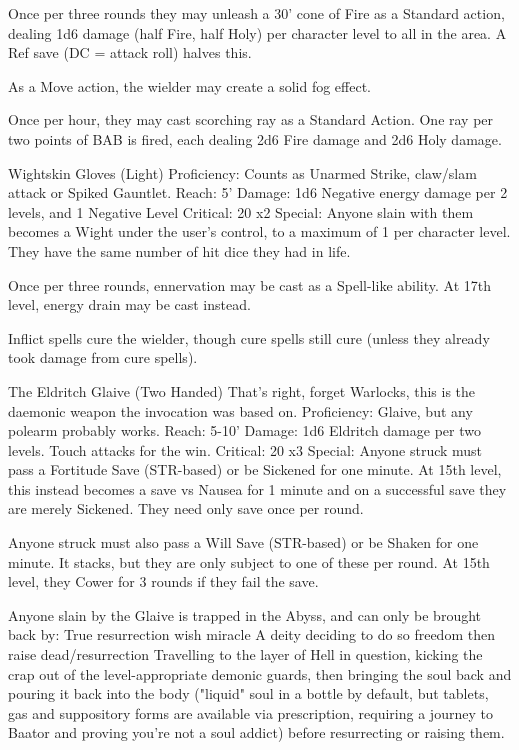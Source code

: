 Once per three rounds they may unleash a 30' cone of Fire as a Standard action, dealing 1d6 damage (half Fire, half Holy) per character level to all in the area. A Ref save (DC = attack roll) halves this.

As a Move action, the wielder may create a solid fog effect.

Once per hour, they may cast scorching ray as a Standard Action. One ray per two points of BAB is fired, each dealing 2d6 Fire damage and 2d6 Holy damage.


Wightskin Gloves (Light)
Proficiency: Counts as Unarmed Strike, claw/slam attack or Spiked Gauntlet.
Reach: 5'
Damage: 1d6 Negative energy damage per 2 levels, and 1 Negative Level
Critical: 20 x2
Special:
Anyone slain with them becomes a Wight under the user's control, to a maximum of 1 per character level. They have the same number of hit dice they had in life.

Once per three rounds, ennervation may be cast as a Spell-like ability. At 17th level, energy drain may be cast instead.

Inflict spells cure the wielder, though cure spells still cure (unless they already took damage from cure spells).



The Eldritch Glaive (Two Handed)
That's right, forget Warlocks, this is the daemonic weapon the invocation was based on. Proficiency: Glaive, but any polearm probably works.
Reach: 5-10'
Damage: 1d6 Eldritch damage per two levels. Touch attacks for the win.
Critical: 20 x3
Special:
Anyone struck must pass a Fortitude Save (STR-based) or be Sickened for one minute. At 15th level, this instead becomes a save vs Nausea for 1 minute and on a successful save they are merely Sickened. They need only save once per round.

Anyone struck must also pass a Will Save (STR-based) or be Shaken for one minute. It stacks, but they are only subject to one of these per round. At 15th level, they Cower for 3 rounds if they fail the save.

Anyone slain by the Glaive is trapped in the Abyss, and can only be brought back by:
True resurrection
wish
miracle
A deity deciding to do so
freedom then raise dead/resurrection
Travelling to the layer of Hell in question, kicking the crap out of the level-appropriate demonic guards, then bringing the soul back and pouring it back into the body ("liquid" soul in a bottle by default, but tablets, gas and suppository forms are available via prescription, requiring a journey to Baator and proving you're not a soul addict) before resurrecting or raising them.


